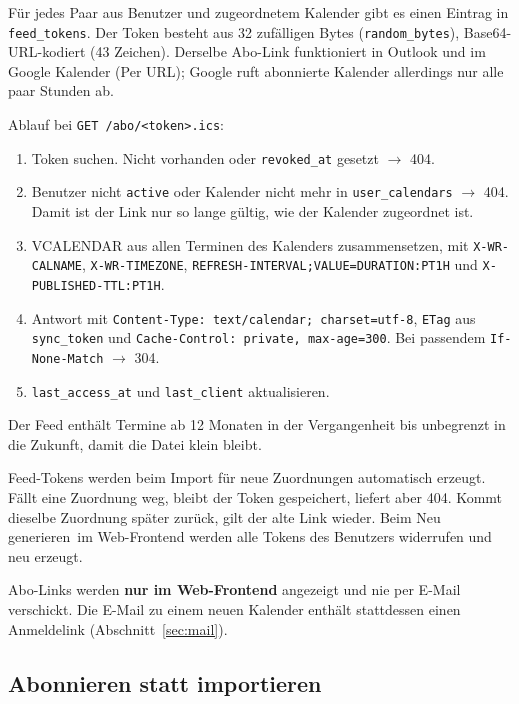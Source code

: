 \documentclass[a4paper,fontsize=10pt]{scrartcl}
\newcommand{\code}[1]{\texttt{#1}}
\begin{document}
Für jedes Paar aus Benutzer und zugeordnetem Kalender gibt es einen Eintrag
in \code{feed\_tokens}. Der Token besteht aus 32 zufälligen Bytes
(\code{random\_bytes}), Base64-URL-kodiert (43 Zeichen). Derselbe Abo-Link
funktioniert in Outlook und im Google Kalender (\glqq Per URL\grqq); Google
ruft abonnierte Kalender allerdings nur alle paar Stunden ab.

Ablauf bei \code{GET /abo/<token>.ics}:

\begin{enumerate}
  \item Token suchen. Nicht vorhanden oder \code{revoked\_at} gesetzt
        $\rightarrow$ 404.
  \item Benutzer nicht \code{active} oder Kalender nicht mehr in
        \code{user\_calendars} $\rightarrow$ 404. Damit ist der Link nur so
        lange gültig, wie der Kalender zugeordnet ist.
  \item VCALENDAR aus allen Terminen des Kalenders zusammensetzen, mit
        \code{X-WR-CALNAME}, \code{X-WR-TIMEZONE},
        \code{REFRESH-INTERVAL;VALUE=DURATION:PT1H} und
        \code{X-PUBLISHED-TTL:PT1H}.
  \item Antwort mit \code{Content-Type: text/calendar; charset=utf-8},
        \code{ETag} aus \code{sync\_token} und \code{Cache-Control:
        private, max-age=300}. Bei passendem \code{If-None-Match}
        $\rightarrow$ 304.
  \item \code{last\_access\_at} und \code{last\_client} aktualisieren.
\end{enumerate}

Der Feed enthält Termine ab 12 Monaten in der Vergangenheit bis
unbegrenzt in die Zukunft, damit die Datei klein bleibt.

Feed-Tokens werden beim Import für neue Zuordnungen automatisch erzeugt.
Fällt eine Zuordnung weg, bleibt der Token gespeichert, liefert aber 404.
Kommt dieselbe Zuordnung später zurück, gilt der alte Link wieder.
Beim \glqq Neu generieren\grqq\ im Web-Frontend werden alle Tokens des
Benutzers widerrufen und neu erzeugt.

Abo-Links werden \textbf{nur im Web-Frontend} angezeigt und nie per E-Mail
verschickt. Die E-Mail zu einem neuen Kalender enthält stattdessen einen
Anmeldelink (Abschnitt~\ref{sec:mail}).

\subsection*{Abonnieren statt importieren}
\end{document}
